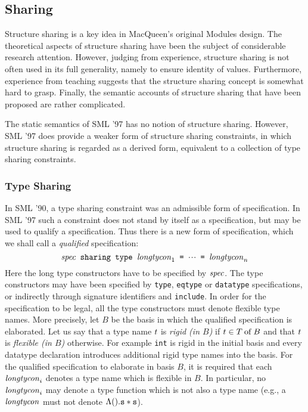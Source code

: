 \subsection{Sharing}
\label{nosharing.sec}
Structure sharing is a 
key idea in MacQueen's original Modules design\cite{mq84}.
The theoretical aspects of structure sharing have been the 
subject of considerable research 
attention\cite{hmt87,tofte88,aponte93,tofte94,MacTo94}. 
However, judging from experience,  structure sharing
is not often used in its full generality, namely to ensure identity of
values. Furthermore, experience from teaching suggests that 
the structure sharing concept is somewhat hard to grasp. Finally, the semantic
accounts of structure sharing that have been proposed are rather 
complicated.

The static semantics of SML '97 
has no notion of structure sharing.
However, SML '97 does provide a weaker form of structure sharing 
constraints, in which structure sharing is 
regarded as a derived form, equivalent to a collection of type sharing
constraints. 

\subsubsection{Type Sharing}
In SML '90, a type sharing constraint
was an admissible form of specification.   In SML '97 such a constraint
does not stand by itself as a specification, but may be used to qualify
a specification. Thus there is a new form of specification, which we
shall call a {\sl qualified} specification:
\[
\hbox{\tt ${\it spec}$ sharing type ${\it longtycon}_1$ = $\mbox{$\cdot\!\cdot\!\cdot$}$ = ${\it longtycon}_n$}
\]
Here the long type constructors have to be specified by ${\it spec}$.
The type constructors may have been specified by {\tt type}, {\tt eqtype}
or {\tt datatype} specifications, or indirectly through signature
identifiers and {\tt include}. In order for the specification to be
legal, all the type constructors must denote flexible type names. More precisely,
let $B$ be the basis in which the qualified specification
is elaborated. 
Let us say that a type name $t$ is {\sl rigid (in $B$)} if $t\in T \mathbin{\rm of} B$
and that $t$ is {\sl flexible (in $B$)} otherwise.
For example {\tt int} is rigid in the initial basis and every datatype
declaration introduces additional rigid type names into the basis. For 
the qualified specification
to elaborate in basis $B$, 
it is required that each ${\it longtycon}_i$ denotes a type name
which is flexible in $B$.  In particular, no ${\it longtycon}_i$
may denote a type function 
which is not also
a type name (e.g., a ${\it longtycon}$
must not denote $\Lambda().\hbox{\tt s}*\hbox{\tt s}$). 

